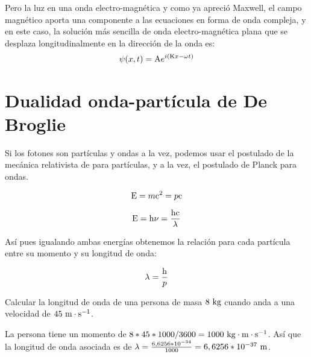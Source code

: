 Pero la luz en una onda electro-magnética y como ya apreció Maxwell, el campo magnético aporta una componente a las ecuaciones en forma de onda compleja, y en este caso, la solución más sencilla de onda electro-magnética plana que se desplaza longitudinalmente en la dirección de la onda es:
\begin{equation}
    \label{eq:solucion-ecuacion-ondas-complejas-simple}
    \psi(x,t)=\mathrm{A} e^{i(\mathrm{K} x - \omega t)}
\end{equation}


\section{Dualidad onda-partícula de De Broglie}\label{sec:dualidad-onda-partícula-de-de-broglie}

Si los fotones son partículas y ondas a la vez, podemos usar el postulado de la mecánica relativista de \energiainstein para partículas, y a la vez, el postulado de Planck para ondas.

\begin{postulate}
    \begin{equation}
        \label{eq:energia-einstein}
        \mathrm{E}=m{\mathrm{c}}^2=p\mathrm{c}
    \end{equation}
\end{postulate}

\begin{postulate}
    \begin{equation}
        \label{eq:energia-planck}
        \mathrm{E}=\mathrm{h}\nu=\frac{\mathrm{h}\mathrm{c}}{\lambda}
    \end{equation}
\end{postulate}

Así pues igualando ambas energías obtenemos la relación para cada partícula entre su momento y su longitud de onda:
\begin{postulate}
    \begin{equation}
        \label{eq:dualidad-de-broglie}
        \lambda=\frac{\mathrm{h}}{p}
    \end{equation}
\end{postulate}

\begin{example}
    Calcular la longitud de onda de una persona de masa $8\ \mathrm{kg}$ cuando anda a una velocidad de $45\ \mathrm{m}\cdot\mathrm{s}^{-1}$.

    La persona tiene un momento de $8*45*1000/3600=1000\ \mathrm{kg}\cdot\mathrm{m}\cdot\mathrm{s}^{-1}$.
    Así que la longitud de onda asociada es de $\lambda=\frac{6,6256*10^{-34}}{1000}=6,6256*10^{-37}\ \mathrm{m}$.
\end{example}

